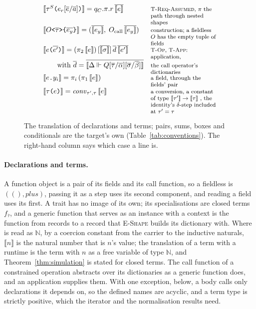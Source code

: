 \begin{figure}[htbp]
\[\begin{array}{@{}l@{\quad}l@{}}
\llbracket \tau^{S}\texttt{(}e_r[\overline{e}/\overline{a}]\texttt{)} \rrbracket = q_C.\pi.r\,\overline{\llbracket e \rrbracket} & \note{\textsc{T-Req-Assumed}, $\pi$  the path through nested shapes} \\
\llbracket O\texttt{<}\overline{\tau}\texttt{>\{}\overline{e_y}\texttt{\}} \rrbracket = (\overline{\llbracket e_y \rrbracket},\; O_{\mathrm{call}}\,\overline{\llbracket e_y \rrbracket}) & \note{construction; a fieldless $O$  has the empty tuple of fields} \\
\llbracket e\texttt{(}\overline{e'}\texttt{)} \rrbracket = (\pi_2\,\llbracket e \rrbracket)\,[\overline{\llbracket \sigma \rrbracket}]\,\overline{d}\,\overline{\llbracket e' \rrbracket} & \note{\textsc{T-Op}, \textsc{T-App}: application,} \\
\qquad \text{with } \overline{d} = \overline{\llbracket \Delta \Vdash Q[\overline{\tau}/\overline{\alpha}][\overline{\sigma}/\overline{\beta}] \rrbracket} & \note{the call operator's dictionaries} \\
\llbracket e\texttt{.}y_i \rrbracket = \pi_i\,(\pi_1\,\llbracket e \rrbracket) & \note{a field, through the fields' pair} \\
\llbracket \tau\texttt{(}e\texttt{)} \rrbracket = \mathit{conv}_{\tau',\tau}\,\llbracket e \rrbracket & \note{a conversion, a constant of type $\llbracket \tau' \rrbracket \to \llbracket \tau \rrbracket$ , the identity's $\delta$-step included at $\tau' = \tau$} \\
\end{array}
\]
\caption{The translation of declarations and terms; pairs, sums, boxes and conditionals are the target's own (Table~\ref{tab:conventions}).
The right-hand column says which case a line is.}
\label{fig:fjlt-translation}
\end{figure}

\paragraph{Declarations and terms.}
A function object is a pair of its fields and its call function, so a fieldless  is $((), \mathit{plus})$, passing it as a step uses its second component, and reading a field uses its first.
A trait has no image of its own; its specialisations are closed terms $f_{\overline{\tau}}$, and a generic function that serves as an instance with a context is the function from records to a record that \textsc{E-Shape} builds its dictionary with.
Where  is read as $\mathbb{N}$, by a coercion constant from the carrier to the inductive naturals, $\llbracket n \rrbracket$ is the natural number that is $n$'s value; the translation of a term with a runtime  is the term with $n$ as a free variable of type $\mathbb{N}$, and Theorem~\ref{thm:simulation} is stated for closed terms.
The call function of a constrained operation abstracts over its dictionaries as a generic function does, and an application supplies them.
With one exception, below, a body calls only declarations it depends on, so the defined names are acyclic, and a term type is strictly positive, which the iterator and the normalisation results need.

